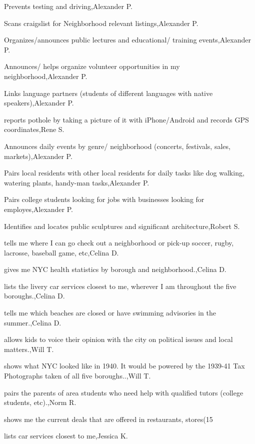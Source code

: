 \documentclass{article}
\begin{document}
Prevents testing and driving,Alexander P.

Scans craigslist for Neighborhood relevant listings,Alexander P.

Organizes/announces public lectures and educational/ training events,Alexander P.

Announces/ helps organize volunteer opportunities in my neighborhood,Alexander P.

Links language partners (students of different languages with native speakers),Alexander P.

reports pothole by taking a picture of it with iPhone/Android and records GPS coordinates,Rene S.

Announces daily events by genre/ neighborhood (concerts, festivals, sales, markets),Alexander P.

Pairs local residents with other local residents for daily tasks like dog walking, watering plants, handy-man tasks,Alexander P.

Pairs college students looking for jobs with businesses looking for employes,Alexander P.

Identifies and locates public sculptures and significant architecture,Robert S.

tells me where I can go check out a neighborhood or pick-up soccer, rugby, lacrosse, baseball game, etc,Celina D.

gives me NYC health statistics by borough and neighborhood.,Celina D.

 lists the livery car services closest to me, wherever I am throughout the five boroughs.,Celina D.

tells me which beaches are closed or have swimming advisories in the summer.,Celina D.

allows kids to voice their opinion with the city on political issues and local matters.,Will T.

shows what NYC looked like in 1940.  It would be powered by the 1939-41 Tax Photographs taken of all five boroughs..,Will T.

pairs the parents of area students who need help with qualified tutors (college students, etc).,Norm R.

shows me the current deals that are offered in restaurants, stores(15%

 lists car services closest to me,Jessica K.
\end{document}
